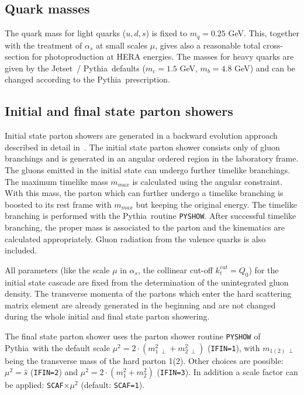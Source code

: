 \documentclass[11pt]{article} \usepackage{mystyle-new}
\newcommand{\kt}{k_{t}}
\def\PYTHIA{{\sc Pythia}}
\def\JETSET{{\sc Jetset}}
\begin{document}
\subsection{Quark masses}

The quark mass for light quarks ($u,d,s$)
 is fixed to $m_q=0.25$ GeV.
 This, together with the treatment of $\alpha_s$ at small scales
$\mu$, gives also a reasonable total cross-section for photoproduction at HERA
energies. The masses for heavy quarks are given by the \JETSET\ / \PYTHIA\ 
defaults ($m_c=1.5$ GeV, $m_b=4.8$ GeV) and can be changed according to the
\PYTHIA\ prescription.


\subsection{Initial and final state parton showers}

Initial state parton showers are generated in a backward evolution approach
described in detail in~\cite{CASCADE,jung_salam_2000}. The initial 
state parton shower
consists only of gluon branchings and is
generated in an angular ordered region in the laboratory frame. 
The gluons emitted in the initial state can undergo further timelike branchings. The maximum timelike mass $m_{max}$ is calculated using the angular constraint. With this mass, the parton which can further undergo a timelike branching is boosted to its rest frame with $m_{max}$ but keeping the original energy. The timelike branching is performed with the \PYTHIA\ routine \verb+PYSHOW+. After successful timelike branching, the proper mass is associated to the parton and the kinematics are calculated appropriately.
Gluon radiation from the valence quarks is also included.

\par
All parameters (like the scale $\mu$
in $\alpha_s$, the collinear cut-off $\kt^{cut}=Q_0$) for  the initial state cascade  
are fixed 
from the determination of the unintegrated gluon density. The
transverse momenta of the partons which enter the hard scattering 
matrix element
are already generated in the beginning and are not changed
during the whole initial and final state
parton showering.
\par
The final state parton shower uses the parton shower routine \verb+PYSHOW+ 
of \PYTHIA\
with the default scale $\mu^2=2\cdot (m_{1\;\perp}^2+m_{2\;\perp}^2)$ (\verb+IFIN=1+),
with $m_{1(2)\;\perp}$ being the transverse mass of the hard parton 1(2). Other choices are possible: $\mu^2=\hat{s}$ (\verb+IFIN=2+) and $\mu^2=2\cdot (m_1^2+m_2^2)$ (\verb+IFIN=3+). In addition a scale factor can be applied: \verb+SCAF+$\times\mu^2 $ (default:  \verb+SCAF=1+).
\end{document}

